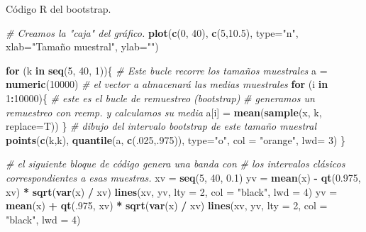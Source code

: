 \documentclass[
  9pt,
  ignorenonframetext,
]{beamer}
\newenvironment{Shaded}{\begin{snugshade}}{\end{snugshade}}
\newcommand{\CommentTok}[1]{\textcolor[rgb]{0.56,0.35,0.01}{\textit{#1}}}
\newcommand{\ControlFlowTok}[1]{\textcolor[rgb]{0.13,0.29,0.53}{\textbf{#1}}}
\newcommand{\DataTypeTok}[1]{\textcolor[rgb]{0.13,0.29,0.53}{#1}}
\newcommand{\DecValTok}[1]{\textcolor[rgb]{0.00,0.00,0.81}{#1}}
\newcommand{\FloatTok}[1]{\textcolor[rgb]{0.00,0.00,0.81}{#1}}
\newcommand{\KeywordTok}[1]{\textcolor[rgb]{0.13,0.29,0.53}{\textbf{#1}}}
\newcommand{\NormalTok}[1]{#1}
\newcommand{\OperatorTok}[1]{\textcolor[rgb]{0.81,0.36,0.00}{\textbf{#1}}}
\newcommand{\StringTok}[1]{\textcolor[rgb]{0.31,0.60,0.02}{#1}}
\begin{document}
\begin{frame}[fragile]{Código R del bootstrap.}
\protect\hypertarget{codigo-r-del-bootstrap.}{}

\small

\begin{Shaded}
\begin{Highlighting}[]
\CommentTok{# Creamos la "caja" del gráfico.}
\KeywordTok{plot}\NormalTok{(}\KeywordTok{c}\NormalTok{(}\DecValTok{0}\NormalTok{, }\DecValTok{40}\NormalTok{), }\KeywordTok{c}\NormalTok{(}\DecValTok{5}\NormalTok{,}\FloatTok{10.5}\NormalTok{), }\DataTypeTok{type=}\StringTok{"n"}\NormalTok{, }\DataTypeTok{xlab=}\StringTok{"Tamaño muestral"}\NormalTok{, }\DataTypeTok{ylab=}\StringTok{""}\NormalTok{) }

\ControlFlowTok{for}\NormalTok{ (k }\ControlFlowTok{in} \KeywordTok{seq}\NormalTok{(}\DecValTok{5}\NormalTok{, }\DecValTok{40}\NormalTok{, }\DecValTok{1}\NormalTok{))\{ }\CommentTok{# Este bucle recorre los tamaños muestrales}
\NormalTok{  a =}\StringTok{  }\KeywordTok{numeric}\NormalTok{(}\DecValTok{10000}\NormalTok{) }\CommentTok{# el vector a almacenará las medias muestrales}
  \ControlFlowTok{for}\NormalTok{ (i }\ControlFlowTok{in} \DecValTok{1}\OperatorTok{:}\DecValTok{10000}\NormalTok{)\{ }\CommentTok{# este es el bucle de remuestreo (bootstrap)}
  \CommentTok{# generamos un remuestreo con reemp. y calculamos su media}
\NormalTok{    a[i] =}\StringTok{ }\KeywordTok{mean}\NormalTok{(}\KeywordTok{sample}\NormalTok{(x, k, }\DataTypeTok{replace=}\NormalTok{T)) }
\NormalTok{    \}}
  \CommentTok{# dibujo del intervalo bootstrap de este tamaño muestral  }
  \KeywordTok{points}\NormalTok{(}\KeywordTok{c}\NormalTok{(k,k), }\KeywordTok{quantile}\NormalTok{(a, }\KeywordTok{c}\NormalTok{(.}\DecValTok{025}\NormalTok{,.}\DecValTok{975}\NormalTok{)), }\DataTypeTok{type=}\StringTok{"o"}\NormalTok{, }
         \DataTypeTok{col =} \StringTok{"orange"}\NormalTok{, }\DataTypeTok{lwd=} \DecValTok{3}\NormalTok{) }
\NormalTok{\}}

\CommentTok{# el siguiente bloque de código genera una banda con }
\CommentTok{# los intervalos clásicos correspondientes a esas muestras.}
\NormalTok{xv =}\StringTok{ }\KeywordTok{seq}\NormalTok{(}\DecValTok{5}\NormalTok{, }\DecValTok{40}\NormalTok{, }\FloatTok{0.1}\NormalTok{) }
\NormalTok{yv =}\StringTok{ }\KeywordTok{mean}\NormalTok{(x) }\OperatorTok{-}\StringTok{ }\KeywordTok{qt}\NormalTok{(}\FloatTok{0.975}\NormalTok{, xv) }\OperatorTok{*}\StringTok{ }\KeywordTok{sqrt}\NormalTok{(}\KeywordTok{var}\NormalTok{(x) }\OperatorTok{/}\StringTok{ }\NormalTok{xv)}
\KeywordTok{lines}\NormalTok{(xv, yv, }\DataTypeTok{lty =} \DecValTok{2}\NormalTok{, }\DataTypeTok{col =} \StringTok{"black"}\NormalTok{, }\DataTypeTok{lwd =} \DecValTok{4}\NormalTok{)}
\NormalTok{yv =}\StringTok{ }\KeywordTok{mean}\NormalTok{(x) }\OperatorTok{+}\StringTok{ }\KeywordTok{qt}\NormalTok{(.}\DecValTok{975}\NormalTok{, xv) }\OperatorTok{*}\StringTok{ }\KeywordTok{sqrt}\NormalTok{(}\KeywordTok{var}\NormalTok{(x) }\OperatorTok{/}\StringTok{ }\NormalTok{xv)}
\KeywordTok{lines}\NormalTok{(xv, yv, }\DataTypeTok{lty =} \DecValTok{2}\NormalTok{, }\DataTypeTok{col =} \StringTok{"black"}\NormalTok{, }\DataTypeTok{lwd =} \DecValTok{4}\NormalTok{)}


\end{Highlighting}
\end{Shaded}
\end{frame}
\end{document}
